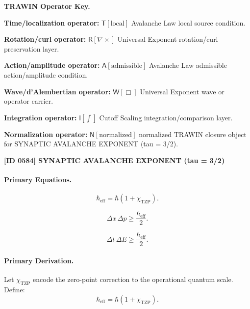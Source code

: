 \par\vspace{0.45\baselineskip}
\noindent\begin{minipage}[t]{\linewidth}
\begingroup
\small
\raggedright
\textbf{TRAWIN Operator Key.}\par
\noindent\textbf{Time/localization operator:} $\mathsf{T}\!\left[\mathrm{local}\right]$ Avalanche Law local source condition.\par
\noindent\textbf{Rotation/curl operator:} $\mathsf{R}\!\left[\nabla\times\right]$ Universal Exponent rotation/curl preservation layer.\par
\noindent\textbf{Action/amplitude operator:} $\mathsf{A}\!\left[\mathrm{admissible}\right]$ Avalanche Law admissible action/amplitude condition.\par
\noindent\textbf{Wave/d'Alembertian operator:} $\mathsf{W}\!\left[\Box\right]$ Universal Exponent wave or operator carrier.\par
\noindent\textbf{Integration operator:} $\mathsf{I}\!\left[\int\right]$ Cutoff Scaling integration/comparison layer.\par
\noindent\textbf{Normalization operator:} $\mathsf{N}\!\left[\mathrm{normalized}\right]$ normalized TRAWIN closure object for SYNAPTIC AVALANCHE EXPONENT (tau = 3/2).\par
\endgroup
\end{minipage}

\clearpage
\noindent\textbf{[ID 0584] SYNAPTIC AVALANCHE EXPONENT (tau = 3/2)}\par
\vspace{0.35em}
\paragraph{Primary Equations.}
\begin{equation}
\hbar_{\mathrm{eff}}
=
\hbar(1+\chi_{\mathrm{TZP}}).
\end{equation}

\begin{equation}
\Delta x\,\Delta p
\geq
\frac{\hbar_{\mathrm{eff}}}{2}.
\end{equation}

\begin{equation}
\Delta t\,\Delta E
\geq
\frac{\hbar_{\mathrm{eff}}}{2}.
\end{equation}

\paragraph{Primary Derivation.}
Let $\chi_{\mathrm{TZP}}$ encode the zero-point correction to the operational quantum scale.  
Define:
\begin{equation}
\hbar_{\mathrm{eff}}
=
\hbar(1+\chi_{\mathrm{TZP}}).
\end{equation}

